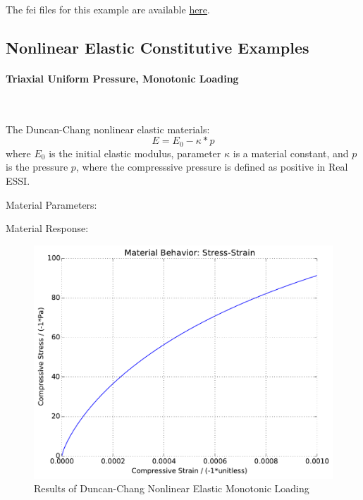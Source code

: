 \documentclass[fleqn,11pt]{article}
\begin{document}
The fei files for this example are available \href{https://github.com/yuan-energy/education_examples/tree/master/fei_examples/linear_elastic/4uniaxial_strain_cyclic_loading}{here}.

\newpage
\subsection{Nonlinear Elastic Constitutive Examples}

\paragraph{Triaxial Uniform Pressure, Monotonic Loading} ~

The Duncan-Chang nonlinear elastic materials:
\begin{equation}
  E = E_0 - \kappa * p
\end{equation}
where $E_0$ is the initial elastic modulus, parameter $\kappa$ is a material constant, and $p$ is the pressure $p$, where the compresssive pressure is defined as positive in Real ESSI.

Material Parameters:


Material Response:
\begin{figure}[H]
\begin{center}
\includegraphics[width=12cm]{../fei_examples/duncan_chang_nonlinear_elasticity/1triaxial_uniform_mono_loading/result.pdf}
\caption{
\label{Res_triaxial_nonlinear_elastic_mono}
Results of Duncan-Chang Nonlinear Elastic Monotonic Loading}
\end{center}
\end{figure}
\end{document}
